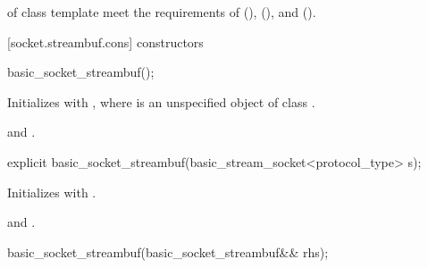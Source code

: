 \pnum
{} of class template  meet the requirements of  (),  (), and  ().


[socket.streambuf.cons]{ constructors}

\begin{itemdecl}
basic_socket_streambuf();
\end{itemdecl}

\begin{itemdescr}
\pnum
\effects Initializes  with , where  is an unspecified object of class .

\pnum
\postconditions {} and .
\end{itemdescr}

\begin{itemdecl}
explicit basic_socket_streambuf(basic_stream_socket<protocol_type> s);
\end{itemdecl}

\begin{itemdescr}
\pnum
\effects Initializes  with .

\pnum
\postconditions {} and .
\end{itemdescr}

\begin{itemdecl}
basic_socket_streambuf(basic_socket_streambuf&& rhs);
\end{itemdecl}

